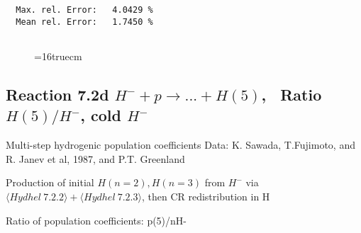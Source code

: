 \documentclass[12pt,dvipdfmx]{article}
\begin{document}
\begin{small}
\begin{verbatim}
  Max. rel. Error:   4.0429 %
  Mean rel. Error:   1.7450 %


\end{verbatim}\end{small}
\begin{figure} \label{7.2c}
\epsfxsize=16truecm
\end{figure}
\newpage

\subsection{
Reaction 7.2d $ H^- + p \rightarrow ...+ H(5) $, \   Ratio $H(5)/H^- $, cold $H^-$
}
 Multi-step hydrogenic population coefficients
 Data: K. Sawada, T.Fujimoto, \cite{kn:Sawada} and R. Janev et al, 1987, and P.T. Greenland

Production of initial $H(n=2), H(n=3)$ from $H^-$ via $ \langle Hydhel~ 7.2.2\rangle + \langle Hydhel~ 7.2.3\rangle$,
 then CR redistribution in H

 Ratio of population coefficients: p(5)/nH-
\end{document}
